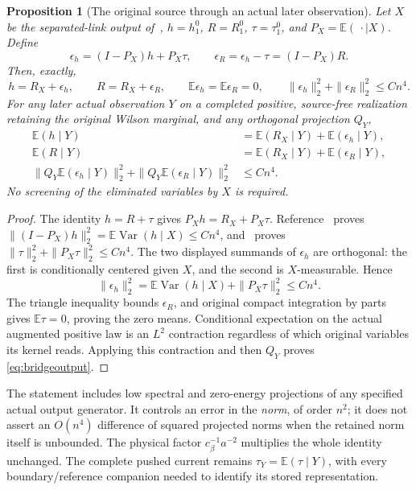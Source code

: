 \documentclass[11pt,letterpaper]{article}
\newtheorem{proposition}[theorem]{Proposition}
\theoremstyle{remark}\newtheorem{remark}[theorem]{Remark}
\newcommand{\E}{\mathbb E}
\newcommand{\Var}{\operatorname{Var}}\newcommand{\Cov}{\operatorname{Cov}}
\newcommand{\cB}{c_\beta}\newcommand{\dd}{\,d}
\begin{document}
\begin{proposition}[The original source through an actual later observation]\label{prop:bridge}
Let \(X\) be the separated-link output of~\cite[\S\S3--5]{SZ}, \(h=h_1^0\), \(R=R_1^0\), \(\tau=\tau_1^0\), and \(P_X=\E(\,\cdot\mid X)\). Define
\[
 \epsilon_h=(I-P_X)h+P_X\tau,
 \qquad \epsilon_R=\epsilon_h-\tau=(I-P_X)R.
\]
Then, exactly,
\begin{equation}\label{eq:bridgeoriginal}
 h=R_X+\epsilon_h,\qquad R=R_X+\epsilon_R,
 \qquad \E\epsilon_h=\E\epsilon_R=0,
 \qquad \|\epsilon_h\|_2^2+\|\epsilon_R\|_2^2\le Cn^4.
\end{equation}
For any later actual observation \(Y\) on a completed positive, source-free realization retaining the original Wilson marginal, and any orthogonal projection \(Q_Y\),
\begin{align}\label{eq:bridgeoutput}
 \E(h\mid Y)&=\E(R_X\mid Y)+\E(\epsilon_h\mid Y),\\
 \E(R\mid Y)&=\E(R_X\mid Y)+\E(\epsilon_R\mid Y),\nonumber\\
 \|Q_Y\E(\epsilon_h\mid Y)\|_2^2+
 \|Q_Y\E(\epsilon_R\mid Y)\|_2^2&\le Cn^4.\nonumber
\end{align}
No screening of the eliminated variables by \(X\) is required.
\end{proposition}
\begin{proof}
The identity \(h=R+\tau\) gives \(P_Xh=R_X+P_X\tau\). Reference~\cite[\S3]{SZ} proves
\(\|(I-P_X)h\|_2^2=\E\Var(h\mid X)\le Cn^4\), and~\cite[\S2.4]{OS} proves
\(\|\tau\|_2^2+\|P_X\tau\|_2^2\le Cn^4\). The two displayed summands of \(\epsilon_h\) are orthogonal: the first is conditionally centered given \(X\), and the second is \(X\)-measurable. Hence
\[
 \|\epsilon_h\|_2^2=
 \E\Var(h\mid X)+\|P_X\tau\|_2^2\le Cn^4.
\]
The triangle inequality bounds \(\epsilon_R\), and original compact integration by parts gives \(\E\tau=0\), proving the zero means. Conditional expectation on the actual augmented positive law is an \(L^2\) contraction regardless of which original variables its kernel reads. Applying this contraction and then \(Q_Y\) proves \eqref{eq:bridgeoutput}.
\end{proof}

The statement includes low spectral and zero-energy projections of any specified actual output generator. It controls an error in the \emph{norm}, of order \(n^2\); it does not assert an \(O(n^4)\) difference of squared projected norms when the retained norm itself is unbounded. The physical factor \(\cB^{-1}a^{-2}\) multiplies the whole identity unchanged. The complete pushed current remains
\(\tau_Y=\E(\tau\mid Y)\), with every boundary/reference companion needed to identify its stored representation.
\end{document}
